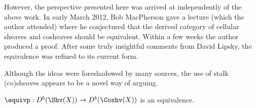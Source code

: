However, the perspective presented here was arrived at independently of the above work. In early March 2012, Bob MacPherson gave a lecture (which the author attended) where he conjectured that the derived category of cellular sheaves and cosheaves should be equivalent. Within a few weeks the author produced a proof. After some truly insightful comments from David Lipsky, the equivalence was refined to its current form.

Although the ideas were foreshadowed by many sources, the use of stalk (co)sheaves appears to be a novel way of arguing.

\begin{thm}[Equivalence]\label{thm:equivalence}
	$\equivp:D^b(\Shv(X))\to D^b(\Coshv(X))$ is an equivalence.
\end{thm}
